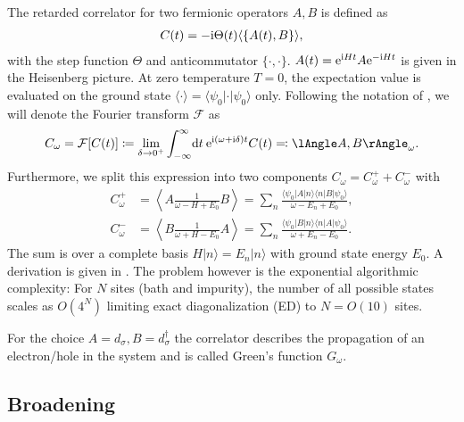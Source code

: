 The retarded correlator for two fermionic operators $A, B$ is defined as
\begin{align}
    C(t) = -\mathrm{i} \Theta(t) \langle\{A(t), B\}\rangle,
\end{align}
with the step function $\Theta$ and anticommutator $\{\cdot,\cdot\}$.
$A(t) = \mathrm{e}^{\mathrm{i} H t} A \mathrm{e}^{-\mathrm{i} H t}$ is given in the Heisenberg picture.
At zero temperature $T=0$, the expectation value is evaluated on the ground state
$\langle\cdot\rangle = \langle\psi_0 | \cdot | \psi_0\rangle$ only.
Following the notation of \cite{Bulla1998,Kugler2022},
we will denote the Fourier transform $\mathcal{F}$ as
\begin{equation}
    C_\omega
    =
    \mathcal{F}[C(t)]
    \coloneq
    \lim_{\delta\to0^+}
    \int_{-\infty}^\infty\! \md t\> \me^{\mi (\omega + \mi\delta) t} C(t)
    \eqcolon
    \lAngle A, B\rAngle_\omega.
\end{equation}
Furthermore,
we split this expression into two components $C_\omega = C^+_\omega + C^-_\omega$ with
\begin{subequations}
    \begin{align}
        C^+_\omega
         & =
        \left\langle A \frac{1}{\omega - H + E_0} B\right\rangle
        =
        \sum_n \frac{\langle\psi_0 | A | n\rangle\langle n | B | \psi_0\rangle}{\omega - E_n + E_0}, \\
        C^-_\omega
         & =
        \left\langle B \frac{1}{\omega + H - E_0} A\right\rangle
        =
        \sum_n \frac{\langle\psi_0 | B | n\rangle\langle n | A | \psi_0\rangle}{\omega + E_n - E_0}.
    \end{align}
\end{subequations}
The sum is over a complete basis $H|n\rangle = E_n|n\rangle$ with ground state energy $E_0$.
A derivation is given in .
The problem however is the exponential algorithmic complexity:
For $N$ sites (bath and impurity), the number of all possible states scales as $O(4^N)$
limiting exact diagonalization (ED) to $N=O(10)$ sites.

For the choice $A=d_\sigma, B=d_\sigma^\dag$ the correlator describes
the propagation of an electron/hole in the system and is called Green's function $G_\omega$.
\subsection{Broadening}

